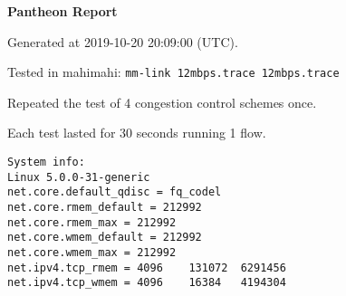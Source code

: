 \documentclass{article}
\begin{document}
\centerline{\textbf{\large{Pantheon Report}}}
\vspace{20pt}

Generated at 2019-10-20 20:09:00 (UTC).

Tested in mahimahi: \texttt{mm-link 12mbps.trace 12mbps.trace}

Repeated the test of 4 congestion control schemes once.

Each test lasted for 30 seconds running 1 flow.

\begin{verbatim}
System info:
Linux 5.0.0-31-generic
net.core.default_qdisc = fq_codel
net.core.rmem_default = 212992
net.core.rmem_max = 212992
net.core.wmem_default = 212992
net.core.wmem_max = 212992
net.ipv4.tcp_rmem = 4096	131072	6291456
net.ipv4.tcp_wmem = 4096	16384	4194304
\end{verbatim}
\end{document}
